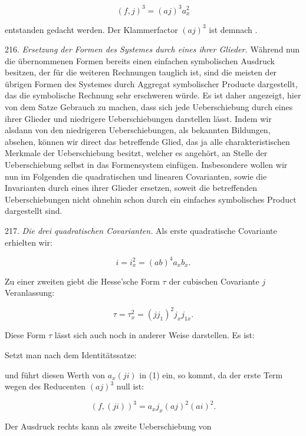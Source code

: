 \[ (f, j)^3 = (aj)^3 a_x^2 \]

entstanden gedacht werden. Der Klammerfactor $(aj)^3$ ist demnach
.

216. \textit{Ersetzung der Formen des Systemes durch eines ihrer Glieder.}
Während nun die übernommenen Formen bereits einen einfachen symbolischen
 Ausdruck besitzen, der für die weiteren Rechnungen tauglich
 ist, sind die meisten der übrigen Formen des Systemes durch
Aggregat symbolischer Producte dargestellt, das die symbolische Rechnung
 sehr erschweren würde. Es ist daher angezeigt, hier von dem
Satze Gebrauch zu machen, dass sich jede Ueberschiebung durch eines
ihrer Glieder und niedrigere Ueberschiebungen darstellen lässt. Indem
wir alsdann von den niedrigeren Ueberschiebungen, als bekannten
Bildungen, absehen, können wir direct das betreffende Glied, das ja
alle charakteristischen Merkmale der Ueberschiebung besitzt, welcher
es angehört, an Stelle der Ueberschiebung selbst in das Formensystem
einfügen. Insbesondere wollen wir nun im Folgenden die quadratischen
und linearen Covarianten, sowie die Invarianten durch eines ihrer
Glieder ersetzen, soweit die betreffenden Ueberschiebungen nicht ohnehin
 schon durch ein einfaches symbolisches Product dargestellt sind.

217. \textit{Die drei quadratischen Covarianten.} Als erste quadratische
Covariante erhielten wir:

\[ i = i_x^2 = (ab)^4 a_x b_x. \]

Zu einer zweiten giebt die Hesse'sche Form $\tau$ der cubischen Covariante
$j$ Veranlassung:

\[ \tau = \tau_x^2 = (j j_1)^2 j_x j_{1x}. \]

Diese Form $\tau$ lässt sich auch noch in anderer Weise darstellen. Es ist:




Setzt man nach dem Identitätssatze:


und führt diesen Werth von $a_x (ji)$ in (1) ein, so kommt, da der
erste Term wegen des Reducenten $(aj)^3$ null ist:

\[ (f, (ji))^3 = a_x j_x (aj)^2 (ai)^2. \]

Der Ausdruck rechts kann als zweite Ueberschiebung von

